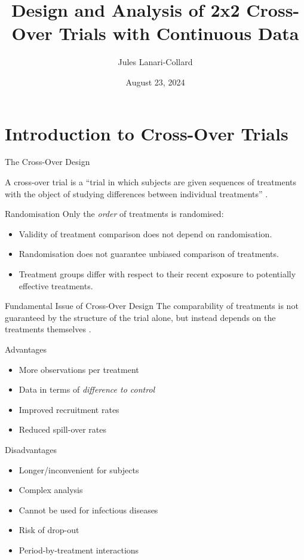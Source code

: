 \documentclass{beamer}
\title{Design and Analysis of 2x2 Cross-Over Trials with Continuous Data}
\author{Jules Lanari-Collard}
\institute{McGill University}
\date{August 23, 2024}
\begin{document}
\frame{\titlepage}

\section{Introduction to Cross-Over Trials}
\begin{frame}{The Cross-Over Design}
\begin{definition}
    A cross-over trial is a ``trial in which subjects are given sequences of treatments with the object of studying differences between individual treatments” \cite{senn2002crossover}.
\end{definition}
\end{frame}

\begin{frame}{Randomisation}
    Only the \textit{order} of treatments is randomised:
    \begin{itemize}
        \item Validity of treatment comparison does not depend on randomisation.
        \item Randomisation does not guarantee unbiased comparison of treatments.
        \item Treatment groups differ with respect to their recent exposure to potentially effective treatments.
    \end{itemize}
    
    \begin{alertblock}{Fundamental Issue of Cross-Over Design}
        The comparability of treatments is not guaranteed by the structure of the trial alone, but instead depends on the treatments themselves \cite{piantadosi2005clinical}.
    \end{alertblock}
\end{frame}

\begin{frame}{Advantages}
    \begin{itemize}
        \item More observations per treatment \cite{senn2002crossover}
        \item Data in terms of \textit{difference to control}
        \item Improved recruitment rates
        \item Reduced spill-over rates \cite{piantadosi2005clinical}
    \end{itemize}
\end{frame}

\begin{frame}{Disadvantages}
    \begin{itemize}
        \item Longer/inconvenient for subjects
        \item Complex analysis
        \item Cannot be used for infectious diseases
        \item Risk of drop-out
        \item Period-by-treatment interactions
    \end{itemize}
\end{frame}
\end{document}
